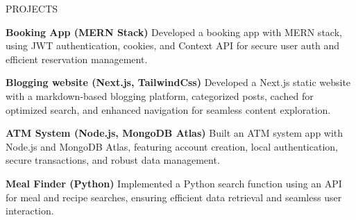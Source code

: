 \documentclass{resume} %
\begin{document}
\begin{rSection}{PROJECTS}
\vspace{-1.3em}
\item \textbf{Booking App (MERN Stack)} {Developed a booking app with MERN stack, using JWT authentication, cookies, and Context API for secure user auth and efficient reservation management.}
\item \textbf{Blogging website (Next.js, TailwindCss)} {Developed a Next.js static website with a markdown-based blogging platform, categorized posts, cached for optimized search, and enhanced navigation for seamless content exploration.}
\item \textbf{ATM System (Node.js, MongoDB Atlas)} {Built an ATM system app with Node.js and MongoDB Atlas, featuring account creation, local authentication, secure transactions, and robust data management.}
\item \textbf{Meal Finder (Python)} {Implemented a Python search function using an API for meal and recipe searches, ensuring efficient data retrieval and seamless user interaction.}
\end{rSection}

\end{document}
